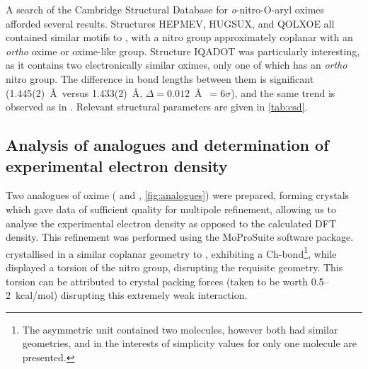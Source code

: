 \begin{refsection}
A search of the Cambridge Structural Database for \emph{o}-nitro-O-aryl oximes afforded several results.\autocite{CSD}
Structures HEPMEV, HUGSUX, and QOLXOE all contained similar motifs to , with a nitro group approximately coplanar with an \emph{ortho} oxime or oxime-like group.\autocite{Saavedra2001,Kostyanovsky2002,Saavedra2006a}
Structure IQADOT was particularly interesting, as it contains two electronically similar oximes, only one of which has an \emph{ortho} nitro group.\autocite{Renaudet2003}
The difference in bond lengths between them is significant (1.445(2)~\AA~versus 1.433(2)~\AA, $\Delta = 0.012$~\AA~$= 6\sigma$), and the same trend is observed as in .
Relevant structural parameters are given in \cref{tab:csd}.

\subsection{Analysis of analogues and determination of experimental electron density}
Two analogues of oxime  ( and , \cref{fig:analogues}) were prepared, forming crystals which gave data of sufficient quality for multipole refinement, allowing us to analyse the experimental electron density as opposed to the calculated DFT density.\autocite{Hansen1978}
This refinement was performed using the MoProSuite software package.\autocite{Jelsch2005}
 crystallised in a similar coplanar geometry to , exhibiting a Ch-bond\footnote{The asymmetric unit contained two molecules, however both had similar geometries, and in the interests of simplicity values for only one molecule are presented.}, while  displayed a torsion of the nitro group, disrupting the requisite geometry.
This torsion can be attributed to crystal packing forces (taken to be worth 0.5--2~kcal/mol) disrupting this extremely weak interaction.\autocite{Dunitz2009}


\end{refsection}
